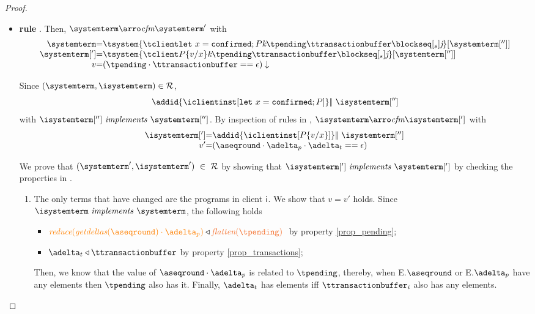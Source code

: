 \begin{proof}
\begin{itemize}
\begin{itemize}
	
	        \item {\bf rule }. Then, $\systemterm  \arroi{\confirmedtran} \systemterm '$ with 
				\[\begin{array}{r@{=}l}
					\systemterm & \tsystem{\tclienti{\tconfirmedins{x}}{\tknown}{\tpending}{\ttransactionbuffer}{\tsent}{\treceivebuffer}}[{\systemterm['']}]
					\\
					\systemterm['] & \tsystem{\tclienti{{\tprogram}\subst{x}{v}}
		{\tknown}{\tpending}{\ttransactionbuffer}{\tsent}{\treceivebuffer}}[{\systemterm['']}]	
					\\
					v & \eval{(\tpending \cdot  \ttransactionbuffer == \epsilon)}
				  \end{array}
				\]
		
		
				Since $(\systemterm,\isystemterm)\in \mathcal{R}$,
				\[\addid{\iclientinst[\tconfirmedins{x}]} \bigpar \ \isystemterm['']\]
				with $\implements{\isystemterm['']}{\systemterm['']}$. By inspection of rules in \figref{}, 
				$\isystemterm \arroi{\confirmedtran} \isystemterm[']$ with
				\[\begin{array}{r@{=}l}
					\isystemterm['] & \addid{\iclientinst[P\subst{x}{v}]} \bigpar \ \isystemterm['']	\\
					v' & (\pending  \cdot \pushbuffer \cdot\transactionbuffer == \epsilon) 
				  \end{array}		
				\]
				
				We  prove that $(\systemterm',\isystemterm') \ \in \ \mathcal{R}$ by showing that $\implements{\isystemterm[']}{\systemterm[']}$ 
				by checking the properties in .			
					\begin{enumerate}
						\item The only terms that have changed are the programs in client ${\sf i}$.  We show that $v=v'$ holds. Since 
						$\implements{\isystemterm}{\systemterm}$, the following holds
						\begin{itemize}
							\item $\ireduce{\igetdeltas{\pending}\cdot{\pushbuffer}}\triangleleft \flatten{\tpending} \ $ by property \ref{prop_pending};
							\item $\transactionbuffer \triangleleft{\ttransactionbuffer}$ by property \ref{prop_transactions};
						\end{itemize}
						Then, we know that the value of $\pending \cdot \pushbuffer$ is related to $\tpending$, thereby, when E.$\pending$ or E.$\pushbuffer$ have any elements then $\tpending$ also has it. Finally, $\transactionbuffer$ has elements iff $\ttransactionbuffer_i$ also has any elements.
			

\end{enumerate}
\end{itemize}
\end{itemize}
\end{proof}
